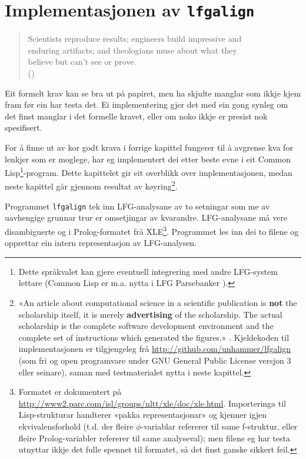 \documentclass[12pt,a4paper,oneside,draft]{report}
\newcommand{\q}[2]{\begin{quotation}\raggedleft{}#1\\\vspace{0.2cm}(#2)\vspace{1.2cm}\end{quotation}}
\begin{document}
\chapter{Implementasjonen av \texttt{lfgalign}}
\label{sec-4}

\label{SEC:implementasjon}

   \q{Scientists reproduce results; engineers build impressive and \\enduring
   artifacts; and theologians muse about what they \\believe but can't see
   or prove.}
   {\citealp[s.~466]{pedersen2008enm}}

Eit formelt krav kan se bra ut på papiret, men ha skjulte manglar som
ikkje kjem fram før ein har testa det.  Ei implementering gjer det med
ein gong synleg om det finst manglar i det formelle kravet, eller om
noko ikkje er presist nok spesifisert.

For å finne ut av kor godt krava i forrige kapittel fungerer til å
avgrense kva for lenkjer som er moglege, har eg implementert dei etter
beste evne i eit Common Lisp\footnote{Dette språkvalet kan gjere eventuell integrering med andre
        LFG-system lettare (Common Lisp er m.a. nytta i LFG
        Parsebanker \citep{rosen2009lpt}). }-program. Dette kapittelet gir eit
overblikk over implementasjonen, medan neste kapittel går gjennom
resultat av køyring\footnote{«An article about computational science in a scientific
       publication is \textbf{not} the scholarship itself, it is
       merely \textbf{advertising} of the scholarship. The actual
       scholarship is the complete software development environment
       and the complete set of instructions which generated the
       figures.» \citep[Jon Claerbout, i][s.~7--8]{stodden2009err}.
       Kjeldekoden til implementasjonen er tilgjengeleg frå
       \href{http://github.com/unhammer/lfgalign}{http://github.com/unhammer/lfgalign} (som fri og open
       programvare under GNU General Public License versjon 3 eller
       seinare), saman med testmaterialet nytta i neste kapittel. }.

Programmet \texttt{lfgalign} tek inn LFG-analysane av to
setningar som me av uavhengige grunnar trur er omsetjingar av
kvarandre. LFG-analysane må vere disambiguerte og i Prolog-formatet
frå XLE\footnote{Formatet er dokumentert på
       \href{http://www2.parc.com/isl/groups/nltt/xle/doc/xle.html}{http://www2.parc.com/isl/groups/nltt/xle/doc/xle.html}. Importeringa
       til Lisp-strukturar handterer «pakka representasjonar» og
       kjenner igjen ekvivalensforhold (t.d. der fleire
       $\phi$-variablar refererer til same f\hyp{}struktur, eller fleire
       Prolog-variabler refererer til same analyseval); men filene eg
       har testa utnyttar ikkje det fulle spennet til formatet, så det
       finst ganske sikkert feil. }. Programmet les inn dei to filene og opprettar ein
intern representasjon av LFG-analysen.  
\end{document}
